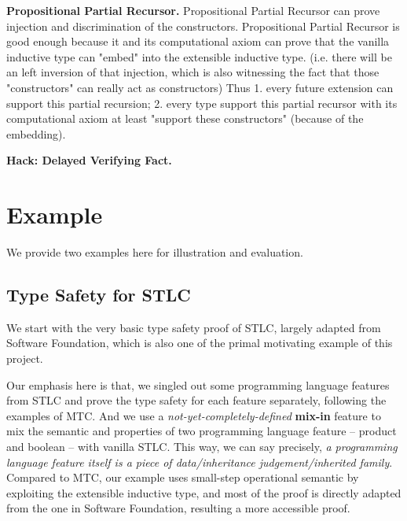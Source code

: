 \textbf{Propositional Partial Recursor.}
Propositional Partial Recursor can prove injection and discrimination of the constructors.
Propositional Partial Recursor is good enough because it and its computational axiom can prove that the vanilla inductive type can "embed" into the extensible inductive type. 
(i.e. there will be an left inversion of that injection, which is also witnessing the fact that those "constructors" can really act as constructors) 
Thus 1. every future extension can support this partial recursion; 2. every type support this partial recursor with its computational axiom at least "support these constructors" (because of the embedding).

\textbf{Hack: Delayed Verifying Fact.}


\section{Example}
We provide two examples here for illustration and evaluation. 

\subsection{Type Safety for STLC}
We start with the very basic type safety proof of STLC, largely adapted from Software Foundation, which is also one of the primal motivating example of this project. 

Our emphasis here is that, we singled out some programming language features from STLC and prove the type safety for each feature separately, following the examples of MTC\citep{delaware2013,forsta2020}. And we use a \textit{not-yet-completely-defined} \textbf{mix-in} feature to mix the semantic and properties of two programming language feature -- product and boolean -- with vanilla STLC. This way, we can say precisely, \textit{a programming language feature itself is a piece of data/inheritance judgement/inherited family}. Compared to MTC, our example uses small-step operational semantic by exploiting the extensible inductive type, and most of the proof is directly adapted from the one in Software Foundation, resulting a more accessible proof. 

